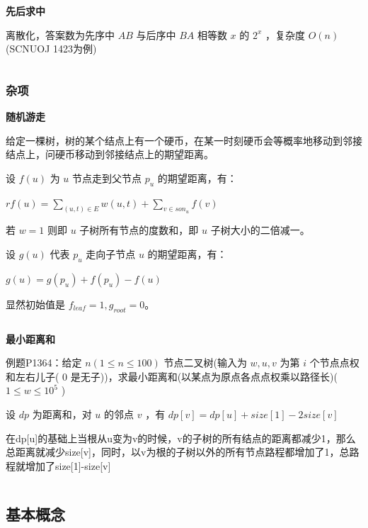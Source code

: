 \documentclass[twocolumn,10pt]{ctexart}
\makeatletter
\newcommand{\hfive}[1]{\par\addvspace{6pt}\@afterindentfalse
  {\noindent\bfseries\normalsize #1}\par\nobreak\vspace{2pt}}
\makeatother
\begin{document}
\hfive{先后求中}

离散化，答案数为先序中 $AB$ 与后序中 $BA$ 相等数 $x$ 的 $2^x$ ，复杂度 $O(n)$ (SCNUOJ 1423为例)

\inputminted{cpp}{code/ext_033.cpp}

\subsubsection{杂项}

\hfive{随机游走}

\begin{notebox}
给定一棵树，树的某个结点上有一个硬币，在某一时刻硬币会等概率地移动到邻接结点上，问硬币移动到邻接结点上的期望距离。
\end{notebox}

设 $f(u)$ 为 $u$ 节点走到父节点 $p_u$ 的期望距离，有：

\begin{adjustbox}{max width=\linewidth,center}
${r}
f(u)=\sum_{(u,t)\in E}w(u,t)+\sum_{v\in son_u}f(v)$
\end{adjustbox}

若 $w=1$ 则即 $u$ 子树所有节点的度数和，即 $u$ 子树大小的二倍减一。

设 $g(u)$ 代表 $p_u$ 走向子节点 $u$ 的期望距离，有：

\begin{adjustbox}{max width=\linewidth,center}
$g(u)=g(p_u)+f(p_u)-f(u)$
\end{adjustbox}

显然初始值是 $f_{leaf}=1,g_{root}=0$。

\inputminted{cpp}{code/tree_random_walk.cpp}

\hfive{最小距离和}

\begin{notebox}
例题P1364：给定 $n(1\le n\le100)$ 节点二叉树(输入为 $w,u,v$ 为第 $i$ 个节点点权和左右儿子( $0$ 是无子))，求最小距离和(以某点为原点各点点权乘以路径长)( $1\le w\le10^5$ )
\end{notebox}

设 $dp$ 为距离和，对 $u$ 的邻点 $v$ ，有 $dp[v]=dp[u]+size[1]-2size[v]$

在dp[u]的基础上当根从u变为v的时候，v的子树的所有结点的距离都减少1，那么总距离就减少size[v]，同时，以v为根的子树以外的所有节点路程都增加了1，总路程就增加了size[1]-size[v]

\inputminted{cpp}{code/p1364_tree_sumdistance.cpp}

\subsection{基本概念}
\end{document}

